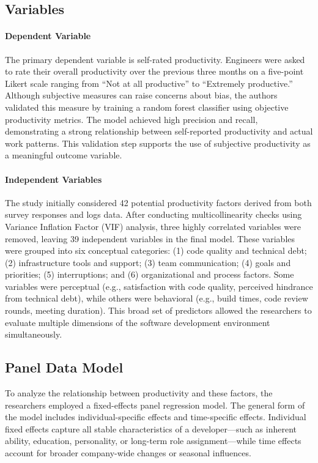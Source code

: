 \subsection{Variables}
\paragraph{Dependent Variable} The primary dependent variable is self-rated productivity. Engineers were asked to rate their overall productivity over the previous three months on a five-point Likert scale ranging from “Not at all productive” to “Extremely productive.” Although subjective measures can raise concerns about bias, the authors validated this measure by training a random forest classifier using objective productivity metrics. The model achieved high precision and recall, demonstrating a strong relationship between self-reported productivity and actual work patterns. This validation step supports the use of subjective productivity as a meaningful outcome variable.

\paragraph{Independent Variables}
The study initially considered 42 potential productivity factors derived from both survey responses and logs data. After conducting multicollinearity checks using Variance Inflation Factor (VIF) analysis, three highly correlated variables were removed, leaving 39 independent variables in the final model.
These variables were grouped into six conceptual categories: (1) code quality and technical debt; (2) infrastructure tools and support; (3) team communication; (4) goals and priorities; (5) interruptions; and (6) organizational and process factors. Some variables were perceptual (e.g., satisfaction with code quality, perceived hindrance from technical debt), while others were behavioral (e.g., build times, code review rounds, meeting duration). This broad set of predictors allowed the researchers to evaluate multiple dimensions of the software development environment simultaneously.

\subsection{Panel Data Model}
To analyze the relationship between productivity and these factors, the researchers employed a fixed-effects panel regression model. The general form of the model includes individual-specific effects and time-specific effects. Individual fixed effects capture all stable characteristics of a developer—such as inherent ability, education, personality, or long-term role assignment—while time effects account for broader company-wide changes or seasonal influences.

